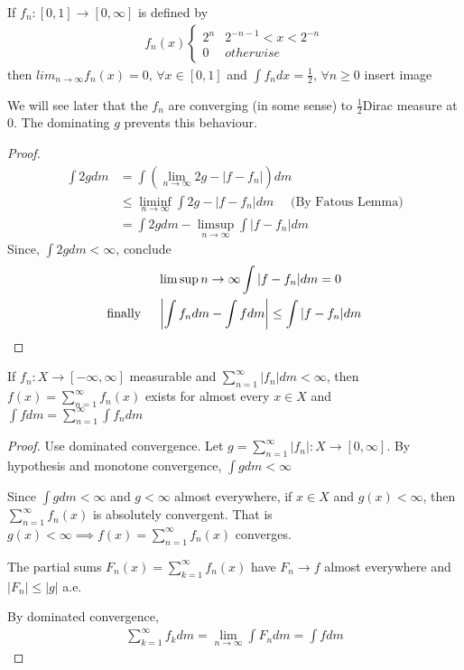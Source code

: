 \begin{example}
	If $f_n : [0,1] \to [0, \infty]$ is defined by
	\begin{align*}
		f_n (x)
		\begin{cases}
			2^n & 2^{-n-1} < x < 2^{-n} \\
			0 & otherwise
		\end{cases}
	\end{align*}
	then $lim_{n \to \infty} f_n (x) = 0, \, \forall x \in [0,1]$ and  $\int f_{n} dx = \frac{1}{2} ,\, \forall n \geq 0$
	insert image
\end{example}

We will see later that the $f_{n}$ are converging (in some sense) to $\frac{1}{2}$Dirac measure at $0$. The dominating $g$ prevents this behaviour.

\begin{proof}
	\begin{align*}
		\int 2g dm &= \int \left( \lim_{n \to \infty} 2g - | f - f_{n}| \right) dm \\
				   &\leq \liminf_{n \to \infty} \int 2g - |f - f_{n}|dm \quad \text{ (By Fatous Lemma)} \\
				   &= \int 2g dm - \limsup_{n \to \infty} \int | f - f_{n}| dm
	\end{align*}
	Since, $\int 2gdm < \infty$, conclude
	\begin{align*}
		&\limsup{n \to \infty} \int |f - f_n | dm = 0 \\ \text{finally \quad}
		& \left| \int f_n dm - \int f dm \right| \leq \int | f - f_n | dm
	\end{align*}
\end{proof}

\begin{corollary}
	If $f_{n} : X \to [-\infty, \infty]$ measurable and $\sum_{n=1}^{\infty} | f_n | dm < \infty$,
	then $f(x) = \sum_{n=1}^{\infty}f_n (x)$ exists for almost every $x \in X$ and $\int f dm = \sum_{n=1}^{\infty} \int f_{n}dm$
\end{corollary}

\begin{proof}
	Use dominated convergence. Let $g = \sum_{n=1}^{\infty} | f_n | : X \to [0,\infty]$.
	By hypothesis and monotone convergence, $\int gdm < \infty$

	Since $\int g dm < \infty$ and $g < \infty$ almost everywhere, if $x \in X$ and $g(x) < \infty$,
	then $\sum_{n=1}^{\infty} f_{n} (x)$ is absolutely convergent. That is $g(x) < \infty \implies f(x) = \sum_{n=1}^{\infty} f_{n}(x)$ converges.

	The partial sums $F_n (x) = \sum_{k=1}^{\infty} f_{n}(x)$ have $F_n \to f$ almost everywhere and $|F_{n}| \leq |g|$ a.e.

	By dominated convergence,
	\begin{align*}
	\sum_{k=1}^{\infty}f_{k} dm = \lim_{n \to \infty} \int F_n dm = \int f dm
	\end{align*}
\end{proof}

